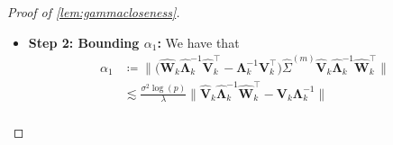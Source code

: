 \documentclass[10pt]{article}
\newcommand{\0}{{\mathbf{0}}}
\newcommand{\1}{{\mathbf{1}}}
\renewcommand{\t}{^{\top}}
\newcommand{\inv}{^{-1}}
\renewcommand{\hat}{\widehat}
\renewcommand{\hat}{\widehat}
\begin{document}
\begin{proof}[Proof of \cref{lem:gammacloseness}]
\begin{itemize}
 In addition, by \cref{lem:Vmatrixcloseness} (whose statement does not depend on this lemma), it holds that
\begin{align}
    \| \mathbf{W}_{\mathbf{V}_k}\t  \mathbf{\Lambda}_k\inv - \mathbf{\hat{\Lambda}}_k\inv \mathbf{\hat W}_k\t \| &\lesssim  \frac{1}{\lambda} \bigg( \frac{\sigma \sqrt{pr} + \kappa^2 \sigma \sqrt{p\log(p)}}{\lambda} \bigg) \label{approxcommute1}
\end{align}
with probability $1 - O(p^{-9})$.  In addition,
\begin{align}
    \| \mathbf{\hat V}_k \mathbf{W}_{\mathbf{V}_k}\t - \mathbf{V}_k \| &= \| \mathbf{\hat V}_k  - \mathbf{V}_k \mathbf{W}_{\mathbf{V}_k}\|  \nonumber \\
    &\leq  \| \mathbf{\hat V}_k  - \mathbf{V}_k \mathbf{W}_{\mathbf{V}_k}\|_F\nonumber  \\
    &= \| \sin\Theta(\mathbf{V}_k ,\mathbf{\hat V}_k ) \|_F \nonumber \\
    &\leq\sqrt{r} \| \sin\Theta(\mathbf{V}_k ,\mathbf{\hat V}_k ) \| \nonumber \\
    &\lesssim \sqrt{r} \frac{\sigma \sqrt{pr} + \kappa^2 \sigma \sqrt{p\log(p)}}{\lambda} \nonumber \\
    &\lesssim \frac{\sigma r \sqrt{p} + \kappa^2 \sigma \sqrt{rp\log(p)}}{\lambda}. \label{vsintheta}
\end{align}
Finally, by \eqref{approxcommute1} and \eqref{vsintheta}, we have that
\begin{align}
     \| \mathbf{\hat V}_k \mathbf{\hat{\Lambda}}_k\inv \mathbf{\hat W}_k\t - \mathbf{V}_k \mathbf{\Lambda}_k\inv \| &\leq  \| \mathbf{\hat V}_k \big( \mathbf{W}_{\mathbf{V}_k}\t \mathbf{\Lambda}_k\inv - \mathbf{\hat{\Lambda}}_k\inv  \mathbf{\hat W}_k\t \big) \| + \| \big(\mathbf{V}_k - \mathbf{\hat V}_k \mathbf{W}_{\mathbf{V}_k}\t \big) \mathbf{\Lambda}_k\inv  \|  \nonumber \\
     &\lesssim  \frac{\sigma r \sqrt{p} + \kappa^2 \sigma \sqrt{rp\log(p)}}{\lambda^2} \label{vhatminusv2}.
\end{align}
\item \textbf{Step 2: Bounding $\alpha_1$:} We have that
\begin{align}
    \alpha_1 &\coloneqq \bigg\| \bigg( \mathbf{\hat W}_k \mathbf{\hat{\Lambda}}_k\inv \mathbf{\hat V}_k\t - \mathbf{\Lambda}_k\inv \mathbf{V}_k\t \bigg) \hat \Sigma^{(m)} \mathbf{\hat V}_k \mathbf{\hat{\Lambda}}_k\inv \mathbf{\hat W}_k\t \bigg\| \nonumber \\
    &\lesssim   \frac{\sigma^2 \log(p)}{\lambda} \| \mathbf{\hat V}_k \mathbf{\hat{\Lambda}}_k\inv \mathbf{\hat W}_k\t - \mathbf{V}_k \mathbf{\Lambda}_k\inv \|   \label{sigmahatboundused1} \\

\end{align}
\end{itemize}
\end{proof}
\end{document}
